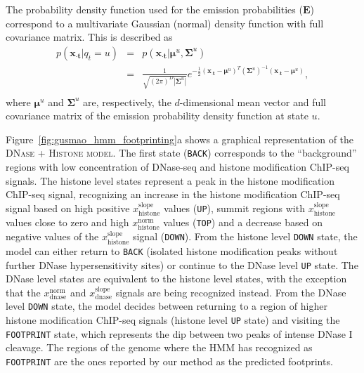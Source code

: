 The probability density function used for the emission probabilities ($\mathbf{E}$) correspond to a multivariate Gaussian (normal) density function with full covariance matrix. This is described as
\begin{equation}
  \label{eq:hmm.emission.gaussian}
  \begin{array}{lcl}
    p(\mathbf{{x}_{\cdot t}} | q_t = u) & = & 
    p(\mathbf{x_{\cdot t}}|{{\boldsymbol\mu}^{u}},{{\boldsymbol\Sigma}^{u}})\\[0.4em] & = &
    \frac{1}{ \sqrt{(2\pi)^{D} {| {{\boldsymbol\Sigma}^{u}} |}}}
    e^{-\frac{1}{2} (\mathbf{x_{\cdot t}}-{{\boldsymbol\mu}^{u}})^T ({{\boldsymbol\Sigma}^{u}})^{-1} (\mathbf{x_{\cdot t}}-{{\boldsymbol\mu}^{u}})}, \\
  \end{array}
\end{equation}
where ${{\boldsymbol\mu}^{u}}$ and ${{\boldsymbol\Sigma}^{u}}$ are, respectively, the $d$-dimensional mean vector and full covariance matrix of the emission probability density function at state $u$.

Figure~\ref{fig:gusmao_hmm_footprinting}a shows a graphical representation of the \textsc{DNase + Histone model}. The first state ({\tt BACK}) corresponds to the ``background'' regions with low concentration of DNase-seq and histone modification ChIP-seq signals. The histone level states represent a peak in the histone modification ChIP-seq signal, recognizing an increase in the histone modification ChIP-seq signal based on high positive $x^{\text{slope}}_{\text{histone}}$ values ({\tt UP}), summit regions with $x^{\text{slope}}_{\text{histone}}$ values close to zero and high $x^{\text{norm}}_{\text{histone}}$ values ({\tt TOP}) and a decrease based on negative values of the $x^{\text{slope}}_{\text{histone}}$ signal ({\tt DOWN}). From the histone level {\tt DOWN} state, the model can either return to {\tt BACK} (isolated histone modification peaks without further DNase hypersensitivity sites) or continue to the DNase level {\tt UP} state. The DNase level states are equivalent to the histone level states, with the exception that the $x^{\text{norm}}_{\text{dnase}}$ and $x^{\text{slope}}_{\text{dnase}}$ signals are being recognized instead. From the DNase level {\tt DOWN} state, the model decides between returning to a region of higher histone modification ChIP-seq signals (histone level {\tt UP} state) and visiting the {\tt FOOTPRINT} state, which represents the dip between two peaks of intense DNase I cleavage. The regions of the genome where the HMM has recognized as {\tt FOOTPRINT} are the ones reported by our method as the predicted footprints.

